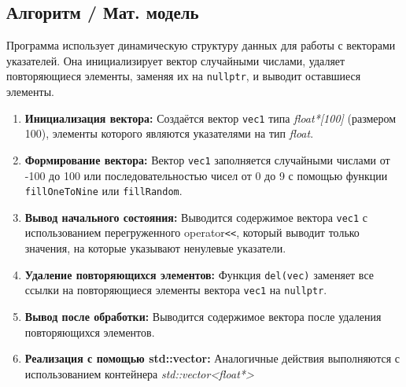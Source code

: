 \documentclass[14pt,a4paper]{article}
\begin{document}
\subsection{Алгоритм / Мат. модель}
Программа использует динамическую структуру данных для работы с векторами
указателей. Она инициализирует вектор случайными числами, удаляет повторяющиеся
элементы, заменяя их на \texttt{nullptr}, и выводит оставшиеся элементы.
\begin{enumerate}
  \item \textbf{Инициализация вектора:} Создаётся вектор \texttt{vec1} типа
    \textsl{float*[100]} (размером 100), элементы которого являются указателями на тип
    \textsl{float}.
  \item \textbf{Формирование вектора:} Вектор \texttt{vec1} заполняется случайными
    числами от -100 до 100 или последовательностью чисел от 0 до 9 с помощью
    функции \texttt{fillOneToNine} или \texttt{fillRandom}.
  \item \textbf{Вывод начального состояния:} Выводится содержимое вектора
    \texttt{vec1} с использованием перегруженного operator\texttt{<<}, который
    выводит только значения, на которые указывают ненулевые указатели.
  \item \textbf{Удаление повторяющихся элементов:} Функция \texttt{del(vec)}
    заменяет все ссылки на повторяющиеся элементы вектора \texttt{vec1} на
    \texttt{nullptr}.
  \item \textbf{Вывод после обработки:} Выводится содержимое вектора после
    удаления повторяющихся элементов.
  \item \textbf{Реализация с помощью std::vector:} Аналогичные действия
    выполняются с использованием контейнера \textsl{std::vector<float*>}
\end{enumerate}
\end{document}
